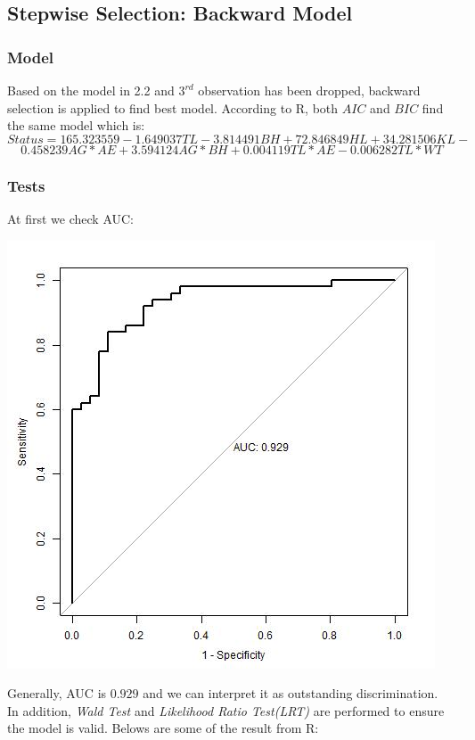 \documentclass[12pt,a4paper]{article}
\begin{document}
\subsection{Stepwise Selection: Backward Model}
\subsubsection{Model}
Based on the model in 2.2 and $3^{rd}$ observation has been dropped, backward selection is applied to find best model. According to R, both $AIC$ and $BIC$ find the same model which is:
\[Status = 165.323559 - 1.649037TL - 3.814491BH + 72.846849HL + 34.281506KL -\]
 \[0.458239AG*AE + 3.594124AG*BH + 0.004119TL*AE - 0.006282TL*WT\]
\subsubsection{Tests}
At first we check AUC:
\begin{center}
\includegraphics[scale = 0.6]{backward.jpg}
\end{center}
Generally, AUC is $0.929$ and we can interpret it as outstanding discrimination.\\
\newline
In addition, \emph{Wald Test} and \emph{Likelihood Ratio Test(LRT)} are performed to ensure the model is valid. Belows are some of the result from R:
\end{document}
